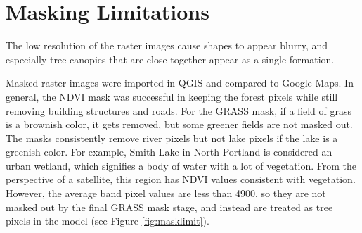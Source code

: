 \documentclass[12pt,twoside]{reedthesis}
\begin{document}
\hypertarget{masking-limitations}{%
\section{Masking Limitations}\label{masking-limitations}}

The low resolution of the raster images cause shapes to appear blurry, and especially tree canopies that are close together appear as a single formation.

Masked raster images were imported in QGIS and compared to Google Maps. In general, the NDVI mask was successful in keeping the forest pixels while still removing building structures and roads. For the GRASS mask, if a field of grass is a brownish color, it gets removed, but some greener fields are not masked out. The masks consistently remove river pixels but not lake pixels if the lake is a greenish color. For example, Smith Lake in North Portland is considered an urban wetland, which signifies a body of water with a lot of vegetation. From the perspective of a satellite, this region has NDVI values consistent with vegetation. However, the average band pixel values are less than 4900, so they are not masked out by the final GRASS mask stage, and instead are treated as tree pixels in the model (see Figure \ref{fig:masklimit}).
\end{document}
